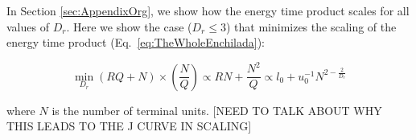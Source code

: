 \documentclass[12pt]{article}
\begin{document}
In Section \ref{sec:AppendixOrg}, we show how the energy time product scales for all values of $D_r$. Here we show the case ($D_r \leq 3$) that minimizes the scaling of the energy time product (Eq.~\ref{eq:TheWholeEnchilada}):


\begin{equation}
  \min_{D_r} (RQ + N) \times \left(\frac{N}{Q}\right) \propto
  RN + \frac{N^2}{Q}
  \propto l_0 + u_0^{-1}N^{2-\frac{2}{D_r}}
\label{eq:bio-min}
\end{equation}

\noindent where $N$ is the number of terminal units. [NEED TO TALK ABOUT WHY
THIS LEADS TO THE J CURVE IN SCALING]







\end{document}
